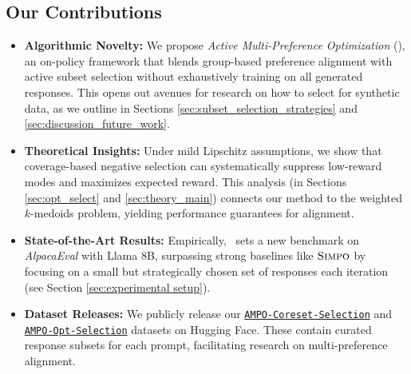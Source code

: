 \subsection{Our Contributions}
\begin{itemize}[leftmargin=1em]
    \item \textbf{Algorithmic Novelty:} We propose \emph{Active Multi-Preference Optimization} (\ampo), an on-policy framework that blends group-based preference alignment with active subset selection without exhaustively training on all generated responses. This opens out avenues for research on how to select for synthetic data, as we outline in Sections \ref{sec:subset_selection_strategies} and \ref{sec:discussion_future_work}.
    \item \textbf{Theoretical Insights:} Under mild Lipschitz assumptions, we show that coverage-based negative selection can systematically suppress low-reward modes and maximizes expected reward. This analysis (in Sections \ref{sec:opt_select} and \ref{sec:theory_main}) connects our method to the weighted $k$-medoids problem, yielding performance guarantees for alignment.
    \item \textbf{State-of-the-Art Results:} Empirically, \ampo\ sets a new benchmark on \textit{AlpacaEval} with Llama 8B, surpassing strong baselines like $\textsc{Simpo}$ by focusing on a small but strategically chosen set of responses each iteration (see Section \ref{sec:experimental setup}).
    \item \textbf{Dataset Releases:} We publicly release our \href{https://huggingface.co/datasets/Multi-preference-Optimization/AMPO-Coreset-selection}{\texttt{AMPO-Coreset-Selection}} 
    and \href{https://huggingface.co/datasets/Multi-preference-Optimization/AMPO-OPT-Selection}{\texttt{AMPO-Opt-Selection}} datasets on Hugging Face. These contain curated response subsets for each prompt, facilitating research on multi-preference alignment.
\end{itemize}

